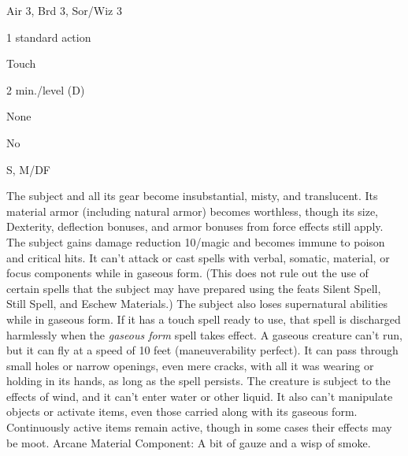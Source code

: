 
\begin{description*}
\item[Level:] Air 3, Brd 3, Sor/Wiz 3
\item[Casting Time:] 1 standard action
\item[Range:] Touch
\item[Duration:] 2 min./level (D)
\item[Saving Throw:] None
\item[Spell Resistance:] No
\item[Components:] S, M/DF
\end{description*}

The subject and all its gear become insubstantial, misty, and translucent. Its
material armor (including natural armor) becomes worthless, though its size, Dexterity,
deflection bonuses, and armor bonuses from force effects still apply. The subject
gains damage reduction 10/magic and becomes immune to poison and critical hits.
It can't attack or cast spells with verbal, somatic, material, or focus components
while in gaseous form. (This does not rule out the use of certain spells that the
subject may have prepared using the feats Silent Spell, Still Spell, and Eschew
Materials.) The subject also loses supernatural abilities while in gaseous form.
If it has a touch spell ready to use, that spell is discharged harmlessly when
the \textit{gaseous form} spell takes effect.
A gaseous creature can't run, but it can fly at a speed of 10 feet (maneuverability
perfect). It can pass through small holes or narrow openings, even mere cracks,
with all it was wearing or holding in its hands, as long as the spell persists.
The creature is subject to the effects of wind, and it can't enter water or other
liquid. It also can't manipulate objects or activate items, even those carried
along with its gaseous form. Continuously active items remain active, though in
some cases their effects may be moot.
Arcane Material Component: A bit of gauze and a wisp of smoke.
